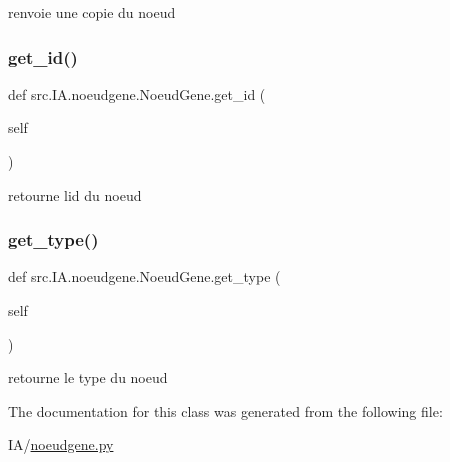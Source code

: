 renvoie une copie du noeud 

\mbox{\label{classsrc_1_1_i_a_1_1noeudgene_1_1_noeud_gene_ad907d09533995a0d76e4ebfff257e64c}} 
\subsubsection{\texorpdfstring{get\+\_\+id()}{get\_id()}}
{\footnotesize\ttfamily def src.\+I\+A.\+noeudgene.\+Noeud\+Gene.\+get\+\_\+id (\begin{DoxyParamCaption}\item[{}]{self }\end{DoxyParamCaption})}



retourne l\textquotesingle{}id du noeud 

\mbox{\label{classsrc_1_1_i_a_1_1noeudgene_1_1_noeud_gene_ad6ae0790a9b26993cb7a9c424e0645e6}} 
\subsubsection{\texorpdfstring{get\+\_\+type()}{get\_type()}}
{\footnotesize\ttfamily def src.\+I\+A.\+noeudgene.\+Noeud\+Gene.\+get\+\_\+type (\begin{DoxyParamCaption}\item[{}]{self }\end{DoxyParamCaption})}



retourne le type du noeud 



The documentation for this class was generated from the following file\+:\begin{DoxyCompactItemize}
\item 
I\+A/\hyperlink{noeudgene_8py}{noeudgene.\+py}\end{DoxyCompactItemize}
